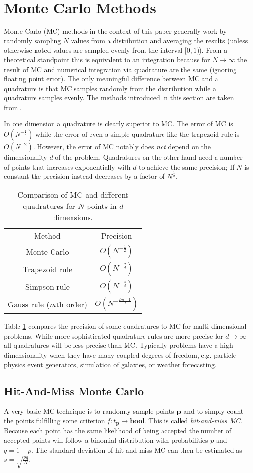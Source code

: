 \section{Monte Carlo Methods}
Monte Carlo (MC) methods in the context of this paper generally work by randomly sampling $N$ values from a distribution
and averaging the results
(unless otherwise noted values are sampled evenly from the interval $[0,1)$).
From a theoretical standpoint this is equivalent to an integration because for $N \rightarrow \infty$ the result of
MC and numerical integration via quadrature are the same (ignoring floating point error).
The only meaningful difference between MC and a quadrature is that MC samples randomly from the distribution
while a quadrature samples evenly.
The methods introduced in this section are taken from \cite{james}.

In one dimension a quadrature is clearly superior to MC.
The error of MC is $O(N^{-\frac{1}{2}})$ while the error of even a simple quadrature like the trapezoid rule is $O(N^{-2})$.
However, the error of MC notably does \textit{not} depend on the dimensionality $d$ of the problem.
Quadratures on the other hand need a number of points that increases exponentially with $d$ to achieve the same precision;
If $N$ is constant the precision instead decreases by a factor of $N^\frac{1}{d}$.
\begin{table}
	\caption{Comparison of MC and different quadratures for $N$ points in $d$ dimensions.}
	\centering
	\begin{tabular}{cc}
		Method & Precision\\
		Monte Carlo & $O(N^{-\frac{1}{2}})$\\
		Trapezoid rule & $O(N^{-\frac{2}{d}})$\\
		Simpson rule & $O(N^{-\frac{4}{d}})$\\
		Gauss rule ($m$th order) & $O(N^{-\frac{2m-1}{d}})$\\
	\end{tabular}
	\label{tab:mc_vs_quad}
\end{table}
Table \ref{tab:mc_vs_quad} compares the precision of some quadratures to MC for multi-dimensional problems.
While more sophisticated quadrature rules are more precise for $d \rightarrow \infty$ all quadratures will be less precise than MC.
Typically problems have a high dimensionality when they have many coupled degrees of freedom,
e.g. particle physics event generators, simulation of galaxies, or weather forecasting.
\subsection{Hit-And-Miss Monte Carlo}
A very basic MC technique is to randomly sample points $\bf p$ and to simply count the points fulfilling some criterion
$f : t_\mathbf{p} \rightarrow \mathbf{bool}$.
This is called \textit{hit-and-miss MC}.
Because each point has the same likelihood of being accepted the number of accepted points will follow a binomial distribution
with probabilities $p$ and $q = 1 - p$.
The standard deviation of hit-and-miss MC can then be estimated as $s = \sqrt{\frac{pq}{N}}$.

